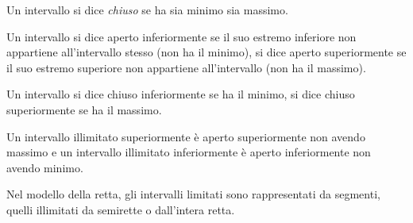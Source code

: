 \begin{newdef}{}{}
Un intervallo si dice \emph{chiuso} se  ha sia minimo sia massimo.
\end{newdef}


\begin{newdef}{}{}
Un intervallo si dice aperto inferiormente se il suo estremo inferiore non 
appartiene all'intervallo stesso (non ha il minimo), 
si dice aperto superiormente se il suo estremo superiore non appartiene 
all'intervallo (non ha il massimo).
\end{newdef}

\begin{newdef}{}{}
Un intervallo si dice chiuso inferiormente se ha il minimo, 
si dice chiuso superiormente se ha il massimo.
\end{newdef}

Un intervallo illimitato superiormente è aperto superiormente non avendo 
massimo e un intervallo illimitato inferiormente è aperto inferiormente non 
avendo minimo.

Nel modello della retta, gli intervalli limitati sono rappresentati da 
segmenti, quelli illimitati da semirette o dall'intera retta.

